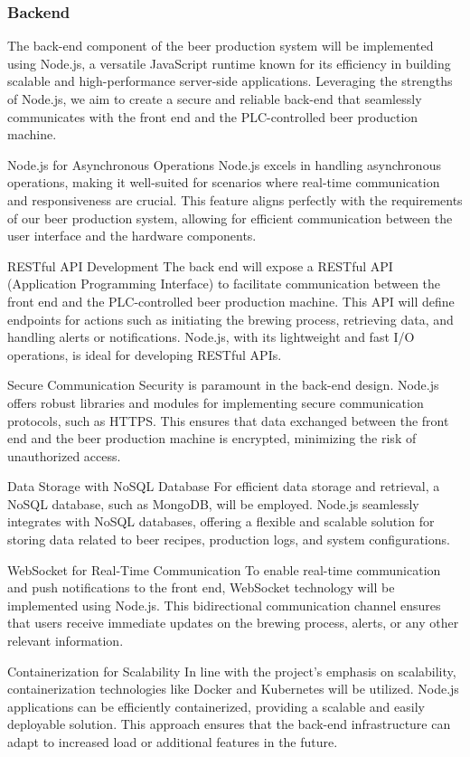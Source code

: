 \subsubsection{Backend}
The back-end component of the beer production system will be implemented using Node.js, a versatile JavaScript runtime known for its efficiency in building scalable and high-performance server-side applications. Leveraging the strengths of Node.js, we aim to create a secure and reliable back-end that seamlessly communicates with the front end and the PLC-controlled beer production machine.

Node.js for Asynchronous Operations
Node.js excels in handling asynchronous operations, making it well-suited for scenarios where real-time communication and responsiveness are crucial. This feature aligns perfectly with the requirements of our beer production system, allowing for efficient communication between the user interface and the hardware components.

RESTful API Development
The back end will expose a RESTful API (Application Programming Interface) to facilitate communication between the front end and the PLC-controlled beer production machine. This API will define endpoints for actions such as initiating the brewing process, retrieving data, and handling alerts or notifications. Node.js, with its lightweight and fast I/O operations, is ideal for developing RESTful APIs.

Secure Communication
Security is paramount in the back-end design. Node.js offers robust libraries and modules for implementing secure communication protocols, such as HTTPS. This ensures that data exchanged between the front end and the beer production machine is encrypted, minimizing the risk of unauthorized access.

Data Storage with NoSQL Database
For efficient data storage and retrieval, a NoSQL database, such as MongoDB, will be employed. Node.js seamlessly integrates with NoSQL databases, offering a flexible and scalable solution for storing data related to beer recipes, production logs, and system configurations.

WebSocket for Real-Time Communication
To enable real-time communication and push notifications to the front end, WebSocket technology will be implemented using Node.js. This bidirectional communication channel ensures that users receive immediate updates on the brewing process, alerts, or any other relevant information.

Containerization for Scalability
In line with the project's emphasis on scalability, containerization technologies like Docker and Kubernetes will be utilized. Node.js applications can be efficiently containerized, providing a scalable and easily deployable solution. This approach ensures that the back-end infrastructure can adapt to increased load or additional features in the future.

